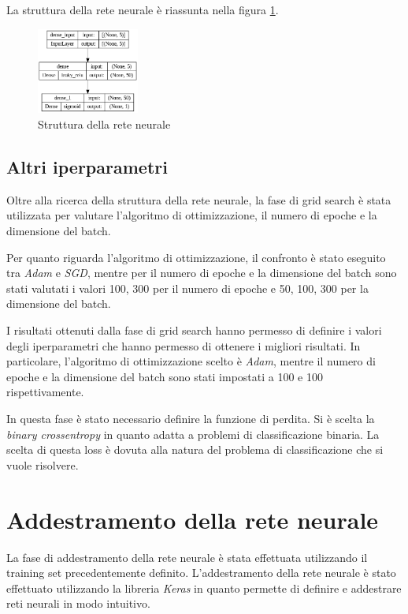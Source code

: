 La struttura della rete neurale è riassunta nella figura \ref{fig:strutturaReteNeurale}.
\begin{figure}[!ht]
    \centering
    \includegraphics[width=0.3\textwidth]{img/rete/struttura_rete.png}
    \caption{Struttura della rete neurale}
    \label{fig:strutturaReteNeurale}
\end{figure}
\subsection*{Altri iperparametri} %
Oltre alla ricerca della struttura della rete neurale, la fase di grid search è
stata utilizzata per valutare l'algoritmo di ottimizzazione, il numero di epoche
e la dimensione del batch.

Per quanto riguarda l'algoritmo di ottimizzazione, il confronto è stato eseguito
tra \textit{Adam} e \textit{SGD}, mentre per il numero di epoche e la dimensione
del batch sono stati valutati i valori 100, 300 per il numero di epoche e 50,
100, 300 per la dimensione del batch.

I risultati ottenuti dalla fase di grid search hanno permesso di definire i valori
degli iperparametri che hanno permesso di ottenere i migliori risultati. In
particolare, l'algoritmo di ottimizzazione scelto è \textit{Adam}, mentre il
numero di epoche e la dimensione del batch sono stati impostati a 100 e 100
rispettivamente.

In questa fase è stato necessario definire la funzione di perdita. Si è scelta
la \textit{binary crossentropy} in quanto adatta a problemi di classificazione
binaria. La scelta di questa loss è dovuta alla natura del problema di
classificazione che si vuole risolvere.
\section{Addestramento della rete neurale}
La fase di addestramento della rete neurale è stata effettuata utilizzando il
training set precedentemente definito. L'addestramento della rete neurale è stato
effettuato utilizzando la libreria \textit{Keras} in quanto permette di definire
e addestrare reti neurali in modo intuitivo.
